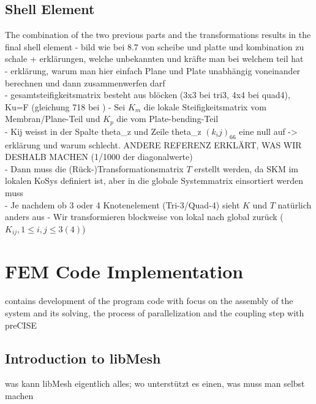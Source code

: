 \documentclass[11pt,twoside]{scrartcl}
\begin{document}
 \subsection{Shell Element}
 The combination of the two previous parts and the transformations results in the final shell element\newline
 - bild wie bei 8.7 von scheibe und platte und kombination zu schale + erklärungen, welche unbekannten und kräfte man bei welchem teil hat\\
 - erklärung, warum man hier einfach Plane und Plate unabhängig voneinander berechnen und dann zusammenwerfen darf\\
 - gesamtsteifigkeitsmatrix besteht aus blöcken (3x3 bei tri3, 4x4 bei quad4), Ku=F (gleichung 718 bei \cite{steinke2005finite})
 - Sei $K_m$ die lokale Steifigkeitsmatrix vom Membran/Plane-Teil und $K_p$ die vom Plate-bending-Teil\\
 - Kij weisst in der Spalte theta\_z und Zeile theta\_z $(k_ij)_66$ eine null auf -> erklärung und warum schlecht. ANDERE REFERENZ ERKLÄRT, WAS WIR DESHALB MACHEN (1/1000 der diagonalwerte)\\
 - Dann muss die (Rück-)Transformationsmatrix $T$ erstellt werden, da SKM im lokalen KoSys definiert ist, aber in die globale Systemmatrix einsortiert werden muss\\
 - Je nachdem ob 3 oder 4 Knotenelement (Tri-3/Quad-4) sieht $K$ und $T$ natürlich anders aus\newline
 - Wir transformieren blockweise von lokal nach global zurück ($K_{ij}, 1 \leq i,j \leq 3(4)$)\newline
 \newpage
\section{FEM Code Implementation}
contains development of the program code with focus on the assembly of the system and its solving, the process of parallelization and the coupling step with preCISE
 \subsection{Introduction to libMesh}
 was kann libMesh eigentlich alles; wo unterstützt es einen, was muss man selbst machen
\end{document}
